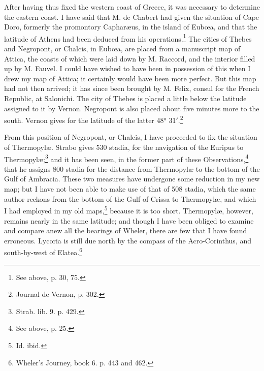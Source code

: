 \documentclass[a4paper, 11pt, oneside, polutonikogreek, english]{article}
\begin{document}
After having thus fixed the western coast of Greece, it was necessary to determine the eastern coast. I have said that M. de Chabert had given the situation of Cape Doro, formerly the promontory Capharæus, in the island of Eubœa, and that the latitude of Athens had been deduced from his operations.\footnote{See above, p. 30, 75.} The cities of Thebes and Negropont, or Chalcis, in Eubœa, are placed from a manuscript map of Attica, the coasts of which were laid down by M. Raccord, and the interior filled up by M. Fauvel. I could have wished to have been in possession of this when I drew my map of Attica; it certainly would have been more perfect. But this map had not then arrived; it has since been brought by M. Felix, consul for the French Republic, at Salonichi. The city of Thebes is placed a little below the latitude assigned to it by Vernon. Negropont is also placed about five minutes more to the south. Vernon gives for the latitude of the latter 48° 31$'$.\footnote{Journal de Vernon, p. 302.}

From this position of Negropont, or Chalcis, I have proceeded to fix the situation of Thermopylæ. Strabo gives 530 stadia, for the navigation of the Euripus to Thermopylæ;\footnote{Strab. lib. 9. p. 429.} and it has been seen, in the former part of these Observations,\footnote{See above, p. 25.} that he assigns 800 stadia for the distance from Thermopylæ to the bottom of the Gulf of Ambracia. These two measures have undergone some reduction in my new map; but I have not been able to make use of that of 508 stadia, which the same author reckons from the bottom of the Gulf of Crissa to Thermopylæ, and which I had employed in my old maps,\footnote{Id. ibid.} because it is too short. Thermopylæ, however, remains nearly in the same latitude; and though I have been obliged to examine and compare anew all the bearings of Wheler, there are few that I have found erroneous. Lycoria is still due north by the compass of the Acro-Corinthus, and south-by-west of Elatea.\footnote{Wheler's Journey, book 6. p. 443 and 462.}
\end{document}
